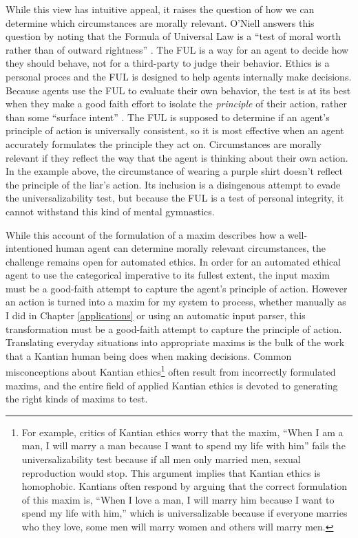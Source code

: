 \begin{isabellebody}
\begin{isamarkuptext}
While this view has intuitive appeal, it raises the question of how we can determine
which circumstances are morally relevant. O'Niell answers this question by noting that the Formula of Universal Law is 
a ``test of moral worth rather than of outward rightness'' \citep[98]{constofreason}. The FUL is a way 
for an agent to decide how they should behave, not for a third-party to judge their behavior. Ethics is 
a personal proces and the FUL is designed to help agents internally make decisions. Because agents use 
the FUL to evaluate their own behavior, the test is at its 
best when they make a good faith effort to isolate the \emph{principle} of their action, rather than some
``surface intent'' \citep[87]{constofreason}. The FUL is supposed to determine if an agent's principle of action
is universally consistent, so it is most effective when an agent accurately formulates the principle
they act on. Circumstances are morally relevant if they reflect the way that the agent is 
thinking about their own action. In the example above, the circumstance of wearing a purple shirt doesn't reflect
the principle of the liar's action. Its inclusion is a disingenous attempt to evade the universalizability
test, but because the FUL is a test of personal integrity, it cannot withstand this kind of mental
gymnastics.

While this account of the formulation of a maxim describes how a well-intentioned human agent can determine 
morally relevant circumstances, the challenge remains open for automated ethics. In order for an automated
ethical agent to use the categorical imperative to its fullest extent, the input maxim must be a good-faith 
attempt to capture the agent's principle
of action. However an action is turned into a maxim for my system to process, whether manually as I did
in Chapter \ref{applications} or using an automatic input parser, this transformation must be a good-faith 
attempt to capture the principle of action. Translating everyday situations into appropriate maxims is 
the bulk of the work that a Kantian human 
being does when making decisions. Common misconceptions about Kantian ethics\footnote{For example, critics 
of Kantian ethics worry that the maxim, ``When I am a
man, I will marry a man because I want to spend my life with him'' fails the universalizability
test because if all men only married men, sexual reproduction would stop. This argument implies 
that Kantian ethics is homophobic. Kantians often respond by arguing that the correct formulation of 
this maxim is, ``When I love a man, I will marry him because I want to spend my life with him,'' which
is universalizable because if everyone marries who they love, some men will marry women and others will
marry men.} often result from incorrectly formulated maxims, 
and the entire field of applied Kantian ethics is devoted to generating the right kinds of maxims to test. 


\end{isamarkuptext}
\end{isabellebody}
